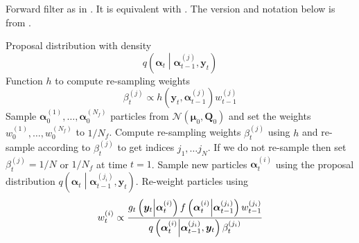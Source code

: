 \documentclass[notitlepage]{article}
\newcommand\StateX{\Statex\hspace{\algorithmicindent}}
\renewcommand{\vec}[1]{\bm{#1}}
\newcommand{\mat}[1]{\mathbf{#1}}
\newcommand{\Lparen}[1]{\left( #1\right)}
\newcommand{\Cond}[2]{ #1 \middle\vert  #2}
\newcommand{\optor}[2]{#1\Lparen{#2}}
\newcommand{\optorC}[3]{\optor{#1}{\Cond{#2}{#3}}}
\newcommand{\gFunc}[3]{\optorC{g_{#3}}{#1}{#2}}
\newcommand{\fFunc}[2]{\optorC{f}{#1}{#2}}
\newcommand{\normal}[2]{\optor{\mathcal{N}}{#1,#2}}
\newcommand{\IDC}[2]{\optorC{q}{#1}{#2}}
\newcommand{\partic}[3]{#1_{#2}^{\Lparen{#3}}}
\newcommand{\nPart}{N}
\newcommand{\nPeriods}{d}
\begin{document}
\begin{algorithm}[H]
\caption{Forward filter as in \cite{pitt99}. It is equivalent with \citet[p. 20 and 25]{doucet09}. The version and notation below is from \citet[p. 449]{fearnhead10}.}\label{alg:forward}
\begin{algorithmic}[1]\raggedright
\INPUT
\Statex Proposal distribution with density 
\Statex $$
\IDC{\vec{\alpha}_t}{\partic{\vec{\alpha}}{t-1}{j}, \vec{y}_t}
$$
\Statex Function $h$ to compute re-sampling weights 
$$
	\partic{\beta}{t}{j} \propto h(\vec{y}_t,\partic{\vec{\alpha}}{t-1}{j})\partic{w}{t-1}{j}
$$
\State Sample $\partic{\vec{\alpha}}{0}{1},\dots,\partic{\vec{\alpha}}{0}{\nPart_f}$ particles from $\normal{\vec\mu_0}{\mat{Q}_0}$ and set the weights $\partic{w}{0}{1},\dots,\partic{w}{0}{\nPart_f}$ to $1 / \nPart_f$.
%
\For{$t=1,\dots, \nPeriods$}
\State Compute re-sampling weights $\partic{\beta}{t}{j}$ using $h$ and re-sample 
according to $\partic{\beta}{t}{j}$ to get indices $j_1,\dots j_\nPart$. If we do not 
re-sample then set $\partic{\beta}{t}{j} = 1 / \nPart$ or $1/ \nPart_f$ at time $t = 1$.
\EndProcedure
%
\State Sample new particles $\partic{\vec{\alpha}}{t}{i}$ using the proposal distribution $\IDC{\vec{\alpha}_t}{\partic{\vec{\alpha}}{t-1}{j_i}, \vec{y}_t}$.
\EndProcedure
%
\State Re-weight particles using 
\StateX \begin{equation}\label{eqn:forwardWeight}
	\partic{w}{t}{i} \propto \frac{
		\gFunc{\vec{y}_t}{\partic{\vec{\alpha}}{t}{i}}{t}
		\fFunc{\partic{\vec{\alpha}}{t}{i}}{\partic{\vec{\alpha}}{t-1}{j_i}}
		\partic{w}{t-1}{j_i}
	}{ %
		\IDC{\partic{\vec{\alpha}}{t}{i}}{\partic{\vec{\alpha}}{t-1}{j_i}, \vec{y}_t}
		\partic{\beta}{t}{j_i}
	}
\end{equation}
\EndProcedure
\EndFor
\end{algorithmic}
\end{algorithm}
\end{document}
